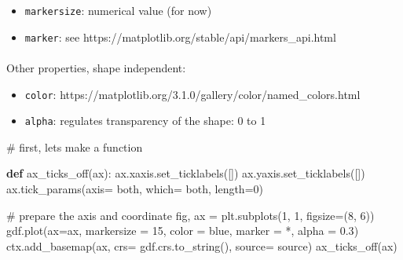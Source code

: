 \documentclass[
  letterpaper,
  DIV=11,
  numbers=noendperiod]{scrreprt}
\makeatletter
\let\oldparagraph\paragraph
\renewcommand{\paragraph}{
    \@ifstar
      \xxxParagraphStar
      \xxxParagraphNoStar
  }
\newcommand{\xxxParagraphStar}[1]{\oldparagraph*{#1}\mbox{}}
\newcommand{\xxxParagraphNoStar}[1]{\oldparagraph{#1}\mbox{}}
\newenvironment{Shaded}{\begin{snugshade}}{\end{snugshade}}
\newcommand{\CommentTok}[1]{\textcolor[rgb]{0.37,0.37,0.37}{#1}}
\newcommand{\DecValTok}[1]{\textcolor[rgb]{0.68,0.00,0.00}{#1}}
\newcommand{\FloatTok}[1]{\textcolor[rgb]{0.68,0.00,0.00}{#1}}
\newcommand{\KeywordTok}[1]{\textcolor[rgb]{0.00,0.23,0.31}{\textbf{#1}}}
\newcommand{\NormalTok}[1]{\textcolor[rgb]{0.00,0.23,0.31}{#1}}
\newcommand{\OperatorTok}[1]{\textcolor[rgb]{0.37,0.37,0.37}{#1}}
\newcommand{\StringTok}[1]{\textcolor[rgb]{0.13,0.47,0.30}{#1}}
\providecommand{\tightlist}{%
  \setlength{\itemsep}{0pt}\setlength{\parskip}{0pt}}\usepackage{longtable,booktabs,array}
\makeatother
\begin{document}
\begin{itemize}
\tightlist
\item
  \texttt{markersize}: numerical value (for now)
\item
  \texttt{marker}: see
  https://matplotlib.org/stable/api/markers\_api.html
\end{itemize}

\paragraph{Other properties, shape
independent:}\label{other-properties-shape-independent}

\begin{itemize}
\tightlist
\item
  \texttt{color}:
  https://matplotlib.org/3.1.0/gallery/color/named\_colors.html
\item
  \texttt{alpha}: regulates transparency of the shape: 0 to 1
\end{itemize}

\begin{Shaded}
\begin{Highlighting}[]
\CommentTok{\# first, let\textquotesingle{}s make a function}

\KeywordTok{def}\NormalTok{ ax\_ticks\_off(ax):}
\NormalTok{    ax.xaxis.set\_ticklabels([])}
\NormalTok{    ax.yaxis.set\_ticklabels([])}
\NormalTok{    ax.tick\_params(axis}\OperatorTok{=} \StringTok{\textquotesingle{}both\textquotesingle{}}\NormalTok{, which}\OperatorTok{=} \StringTok{\textquotesingle{}both\textquotesingle{}}\NormalTok{, length}\OperatorTok{=}\DecValTok{0}\NormalTok{)}
\end{Highlighting}
\end{Shaded}

\begin{Shaded}
\begin{Highlighting}[]
\CommentTok{\# prepare the axis and coordinate}
\NormalTok{fig, ax }\OperatorTok{=}\NormalTok{ plt.subplots(}\DecValTok{1}\NormalTok{, }\DecValTok{1}\NormalTok{, figsize}\OperatorTok{=}\NormalTok{(}\DecValTok{8}\NormalTok{, }\DecValTok{6}\NormalTok{))}
\NormalTok{gdf.plot(ax}\OperatorTok{=}\NormalTok{ax, markersize }\OperatorTok{=} \DecValTok{15}\NormalTok{, color }\OperatorTok{=} \StringTok{\textquotesingle{}blue\textquotesingle{}}\NormalTok{, marker }\OperatorTok{=} \StringTok{\textquotesingle{}*\textquotesingle{}}\NormalTok{, alpha }\OperatorTok{=} \FloatTok{0.3}\NormalTok{)}
\NormalTok{ctx.add\_basemap(ax, crs}\OperatorTok{=}\NormalTok{ gdf.crs.to\_string(), source}\OperatorTok{=}\NormalTok{ source)}
\NormalTok{ax\_ticks\_off(ax)}
\end{Highlighting}
\end{Shaded}
\end{document}
